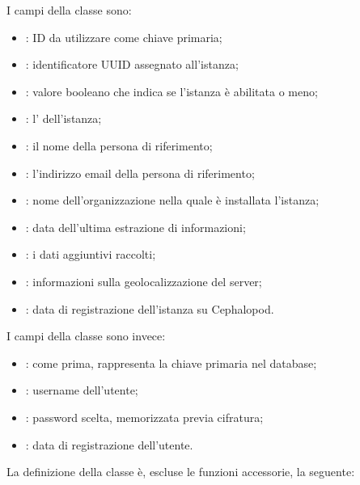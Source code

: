             I campi della classe  sono:
            
            \begin{itemize}
                \item {}: ID da utilizzare come chiave primaria;
                \item {}: identificatore \ac{UUID} assegnato all'istanza;
                \item {}: valore booleano che indica se l'istanza è abilitata o meno;
                \item {}: l' dell'istanza;
                \item {}: il nome della persona di riferimento;
                \item {}: l'indirizzo email della persona di riferimento;
                \item {}: nome dell'organizzazione nella quale è installata l'istanza;
                \item {}: data dell'ultima estrazione di informazioni;
                \item {}: i dati aggiuntivi raccolti;
                \item {}: informazioni sulla geolocalizzazione del server;
                \item {}: data di registrazione dell'istanza su Cephalopod.
            \end{itemize}
            
            I campi della classe  sono invece:
            
            \begin{itemize}
                \item {}: come prima, rappresenta la chiave primaria nel database;
                \item {}: username dell'utente;
                \item {}: password scelta, memorizzata previa cifratura;
                \item {}: data di registrazione dell'utente.
            \end{itemize}
            
            La definizione della classe  è, escluse le funzioni accessorie, la seguente:
            

